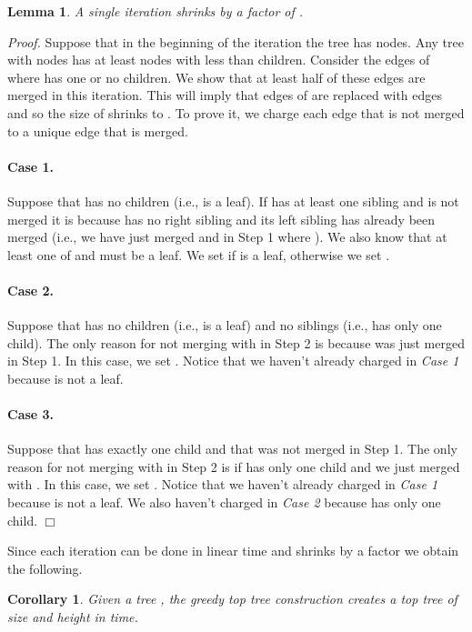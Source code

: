\documentclass [11pt]{article}
\newtheorem{lemma}{Lemma}
\newtheorem{corollary}{Corollary}
\newcommand{\qed}{\hfill\ensuremath{\Box}\medskip\\\noindent}
\newenvironment{proof}{\noindent\emph{Proof. }}{}
\begin{document}
\begin{lemma}\label{lem:contractionfactor}
A single iteration shrinks  by a factor of .
\end{lemma}
\begin{proof}
Suppose that  in the beginning of the iteration the tree  has  nodes. 
Any tree with  nodes has at least  nodes with less than  children. Consider the edges  of  where  has one or no children. We show that at least half of these   edges are merged in this iteration. This will imply that  edges of  are replaced with  edges and so the size of  shrinks to . To prove it, we charge each edge  that is not merged to a unique edge  that is merged.


\paragraph{Case 1.} 
Suppose that  has no children (i.e., is a leaf).   If  has at least one sibling and  is not merged it is because  has no right sibling and its left sibling  has already been merged (i.e., we have just merged  and  in Step 1 where ). 
We also know that at least one of  and  must be a leaf. We set  if  is a leaf, otherwise we set . 

\paragraph{Case 2.} 
Suppose that  has no children (i.e., is a leaf) and no siblings (i.e.,  has only one child). The only reason for not merging  with  in Step 2 is because   was just merged in Step 1. In this case, we set . Notice that we haven't already charged  in {\em Case 1} because  is not a leaf.

\paragraph{Case 3.} 
Suppose that  has exactly one child  and that  was not merged in Step 1. 
The only reason for not merging  with  in Step 2 is if  has only one child  and we just merged   with  . In this case, we set .
Notice that we haven't already charged  in {\em Case 1} because  is not a leaf. We also haven't  charged  in {\em Case 2} because  has only one child.  \qed
\end{proof}

\noindent Since each iteration can be done in linear time and shrinks  by a factor  we obtain the following.
\begin{corollary}
Given a tree , the greedy top tree construction creates a top tree of size   and height  in  time.
\end{corollary}
\end{document}
